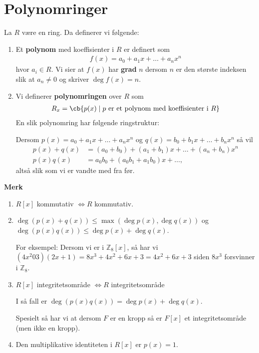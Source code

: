 \section{Polynomringer}
\begin{definition}{}{}
	La $R$ være en ring. Da definerer vi følgende:
	\begin{enumerate}
		\item Et \textbf{polynom} med koeffisienter i $R$ er definert som
		      \begin{align}
			      f(x) = a_0 + a_1x + \dots + a_nx^n
		      \end{align}
		      hvor $a_i \in R$. Vi sier at $f(x)$ har \textbf{grad} $n$ dersom $n$ er den største indeksen
		      slik at $a_n \neq 0$ og skriver $\deg f(x) = n$.
		\item Vi definerer \textbf{polynomringen} over $R$ som
		      \begin{align}
			      R\sb{x} = \cb{p(x)\mid p\text{ er et polynom med koeffisienter i }R}
		      \end{align}
		      En slik polynomring har følgende ringstruktur:

		      Dersom $p(x) = a_0 + a_1x + \dots + a_nx^n$ og $q(x) = b_0 + b_1x + \dots + b_nx^n$
		      så vil
		      \begin{align}
			      p(x) + q(x) & = (a_0 + b_0) + (a_1 + b_1)x + \dots + (a_n + b_n)x^n \\
			      p(x)q(x)    & = a_0b_0 + (a_0b_1 + a_1b_0)x + \dots,
		      \end{align}
		      altså slik som vi er vandte med fra før.
	\end{enumerate}
\end{definition}
\textbf{Merk}
\begin{enumerate}
	\item $R[x]$ kommutativ $\iff R$ kommutativ.
	\item $\deg (p(x) + q(x)) \leq \max(\deg p(x), \deg q(x))$ og
	      $\deg (p(x)q(x)) \leq \deg p(x) + \deg q(x)$.

	      For eksempel: Dersom vi er i $\mathbb{Z}_8[x]$,
	      så har vi $(4x^2 0 3)(2x+1) = 8x^3 + 4x^2 + 6x + 3 = 4x^2 + 6x + 3$ siden $8x^3$ forsvinner
	      i $\mathbb{Z}_8$.
	\item $R[x]$ integritetsområde $\iff R$ integritetsområde

	      I så fall er $\deg (p(x)q(x)) = \deg p(x) + \deg q(x)$.

        Spesielt så har vi at dersom $F$ er en kropp så er $F[x]$ et integritetsområde (men ikke 
        en kropp).
      \item Den multiplikative identiteten i $R[x]$ er $p(x) = 1$. 
\end{enumerate}

